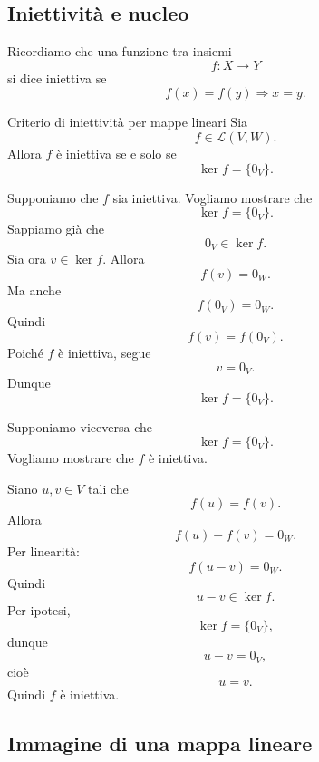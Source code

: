 \documentclass[a4paper]{article}
\begin{document}
\subsection{Iniettività e nucleo}

Ricordiamo che una funzione tra insiemi
\[
    f:X\to Y
\]
si dice iniettiva se
\[
    f(x)=f(y)
    \Longrightarrow
    x=y.
\]

\begin{snippetproposition}{Criterio di iniettività per mappe lineari}
    Sia
    \[
        f\in\mathcal{L}(V,W).
    \]
    Allora \(f\) è iniettiva se e solo se
    \[
        \ker f=\{0_V\}.
    \]
\end{snippetproposition}

\begin{snippetproof}{}
    \begin{iffproof}
    \item Supponiamo che \(f\) sia iniettiva. Vogliamo mostrare che
        \[
            \ker f=\{0_V\}.
        \]
        Sappiamo già che
        \[
            0_V\in\ker f.
        \]
        Sia ora \(v\in\ker f\). Allora
        \[
            f(v)=0_W.
        \]
        Ma anche
        \[
            f(0_V)=0_W.
        \]
        Quindi
        \[
            f(v)=f(0_V).
        \]
        Poiché \(f\) è iniettiva, segue
        \[
            v=0_V.
        \]
        Dunque
        \[
            \ker f=\{0_V\}.
        \]

    \item Supponiamo viceversa che
        \[
            \ker f=\{0_V\}.
        \]
        Vogliamo mostrare che \(f\) è iniettiva.

        Siano \(u,v\in V\) tali che
        \[
            f(u)=f(v).
        \]
        Allora
        \[
            f(u)-f(v)=0_W.
        \]
        Per linearità:
        \[
            f(u-v)=0_W.
        \]
        Quindi
        \[
            u-v\in\ker f.
        \]
        Per ipotesi,
        \[
            \ker f=\{0_V\},
        \]
        dunque
        \[
            u-v=0_V,
        \]
        cioè
        \[
            u=v.
        \]
        Quindi \(f\) è iniettiva.
    \end{iffproof}
\end{snippetproof}

\subsection{Immagine di una mappa lineare}
\end{document}
